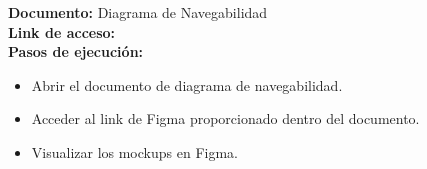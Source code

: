 \textbf{Documento:} Diagrama de Navegabilidad \\
\textbf{Link de acceso:} \linkDocumentoNavegacion \\

\textbf{Pasos de ejecución:}
\begin{itemize}
    \item Abrir el documento de diagrama de navegabilidad.
    \item Acceder al link de Figma proporcionado dentro del documento.
    \item Visualizar los mockups en Figma.
\end{itemize}